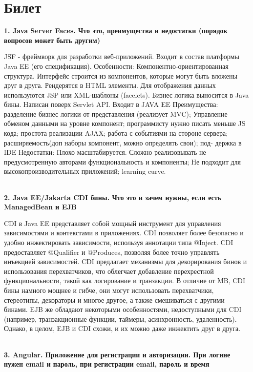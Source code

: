 \documentclass{article}
\newcommand{\bil}[5]{%
        \section{Билет}
        \textbf{1. #1}

        #4
        \\
        \textbf{2. #2}
        
        #5
        \\
        \textbf{3. #3}
}
\begin{document}
\bil{Java Server Faces. Что это, преимущества и недостатки (порядок вопросов может быть другим)}
{Java EE/Jakarta CDI бины. Что это и зачем нужны, если есть ManagedBean и EJB}
{Angular. Приложение для регистрации и авторизации. При логине нужен email и пароль, при регистрации email, пароль и время}{
    JSF - фреймворк для разработки веб-приложений. Входит в состав платформы Java EE (его спецификация). 
    Особенности: Компонентно-ориентированная структура. 
    Интерфейс строится из компонентов, которые могут быть вложены друг в друга. 
    Рендерятся в HTML элементы. Для отображения данных используются JSP или XML-шаблоны (facelets). 
    Бизнес логика выносится в Java бины. Написан поверх Servlet API. 
    Входит в JAVA EE Преимущества: разделение бизнес логики от представления (реализует MVC); Управление обменом данными на уровне компонент; программисту нужно писать меньше JS кода; простота реализации AJAX; работа с событиями на стороне сервера; расширяемость(доп наборы компонент, можно определять свои); под- держка в IDE Недостатки: Плохо масштабируется. 
    Сложно реализовывать не предусмотренную авторами функциональность и компоненты; Не подходит для высокопроизводительных приложений; learning curve.
}{
    CDI в Java EE представляет собой мощный инструмент для управления зависимостями и контекстами в приложениях. 
    CDI позволяет более безопасно и удобно инжектировать зависимости, используя аннотации типа @Inject.
    CDI предоставляет @Qualifier и @Produces, позволяя более точно управлять инъекцией зависимостей.
    CDI предлагает механизмы для декорирования бинов и использования перехватчиков, что облегчает добавление перехрестной функциональности, такой как логирование и транзакции.
    В отличие от MB, CDI бины намного мощнее и гибче, они могут использовать перехватчики, стереотипы, декораторы и многое другое, а также смешиваться с другими бинами. EJB же обладают некоторыми особенностями, недоступными для CDI (например, транзакционные функции, таймеры, асинхронность, удаленность). Однако, в целом, EJB и CDI схожи, и их можно даже инжектить друг в друга.
}
\end{document}

